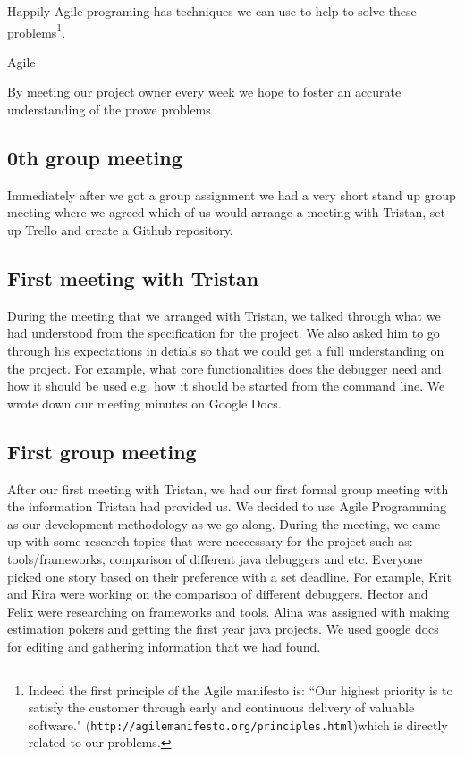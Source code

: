 \documentclass[11pt, a4paper]{article}
\begin{document}
Happily Agile programing has techniques we can use to help to solve these problems\footnote{Indeed the first principle of the Agile manifesto is: ``Our highest priority is to satisfy the customer
through early and continuous delivery of valuable software." ({\tt http://agilemanifesto.org/principles.html})which is directly related to our problems.}.

Agile 

By meeting our project owner every week we hope to foster an accurate understanding of the prowe problems

\subsection{0th group meeting}
Immediately after we got a group assignment we had a very short stand up group meeting where we agreed which of us would arrange a meeting with Tristan, set-up Trello and create a Github repository.  

\subsection{First meeting with Tristan}
During the meeting that we arranged with Tristan, we talked through what we had understood from the specification for the project. We also asked him to go through his expectations in detials so that we could get a full understanding on the project. For example, what core functionalities does the debugger need and how it should be used e.g. how it should be started from the command line. We wrote down our  meeting minutes on Google Docs.

\subsection{First group meeting}
After our first meeting with Tristan, we had our first formal group meeting with the information Tristan had provided us. We decided to use Agile Programming as our development methodology as we go along. During the meeting, we came up with some research topics that were neccessary for the project such as: tools/frameworks, comparison of different java debuggers and etc. Everyone picked one story based on their preference with a set deadline. For example, Krit and Kira were working on the comparison of different debuggers. Hector and Felix were researching on frameworks and tools. Alina was assigned with making estimation pokers and getting the first year java projects. We used google docs for editing and gathering information that we had found. 
\end{document}
